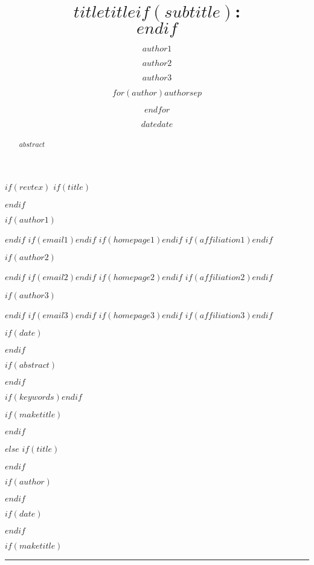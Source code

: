 \documentclass[$if(fontsize)$$fontsize$,$endif$$if(lang)$$lang$,$endif$$if(papersize)$$papersize$,$endif$$for(classoption)$$classoption$$sep$,$endfor$]{$documentclass$}
\begin{document}


$if(revtex)$
$if(title)$\title{$title$}$endif$

$if(author1)$\author{$author1$}$endif$
$if(email1)$$endif$
$if(homepage1)$$endif$
$if(affiliation1)$$endif$

$if(author2)$\author{$author2$}$endif$
$if(email2)$$endif$
$if(homepage2)$$endif$
$if(affiliation2)$$endif$

$if(author3)$\author{$author3$}$endif$
$if(email3)$$endif$
$if(homepage3)$$endif$
$if(affiliation3)$$endif$

$if(date)$\date{$date$}$endif$

$if(abstract)$
\begin{abstract}
$abstract$
\end{abstract}
$endif$

$if(keywords)$$endif$

$if(maketitle)$\maketitle$endif$

$else$
$if(title)$\title{$title$$if(subtitle)$:\\\vspace{0.5em}{\large $subtitle$}$endif$}$endif$

$if(author)$\author{$for(author)$$author$$sep$ \and $endfor$}$endif$

$if(date)$\date{$date$}$endif$

$if(maketitle)$
\thispagestyle{empty}

\noindent\rule{\textwidth}{2pt}

{\let\newpage\relax\maketitle}
\end{document}
